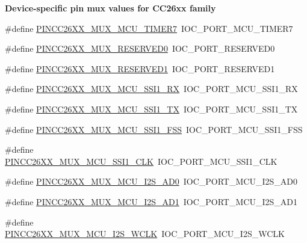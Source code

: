 \begin{Indent}{\bf Device-\/specific pin mux values for C\+C26xx family}
\begin{DoxyCompactItemize}
\item 
\#define \hyperlink{_p_i_n_c_c26_x_x_8h_a5cd4fd779c61244915aef4d6d436866b}{P\+I\+N\+C\+C26\+X\+X\+\_\+\+M\+U\+X\+\_\+\+M\+C\+U\+\_\+\+T\+I\+M\+E\+R7}~I\+O\+C\+\_\+\+P\+O\+R\+T\+\_\+\+M\+C\+U\+\_\+\+T\+I\+M\+E\+R7
\item 
\#define \hyperlink{_p_i_n_c_c26_x_x_8h_af96d092f498cb7a2550b17d9dc20c9bd}{P\+I\+N\+C\+C26\+X\+X\+\_\+\+M\+U\+X\+\_\+\+R\+E\+S\+E\+R\+V\+E\+D0}~I\+O\+C\+\_\+\+P\+O\+R\+T\+\_\+\+R\+E\+S\+E\+R\+V\+E\+D0
\item 
\#define \hyperlink{_p_i_n_c_c26_x_x_8h_ad0b60558170f22cce2aa6b5a9021fb60}{P\+I\+N\+C\+C26\+X\+X\+\_\+\+M\+U\+X\+\_\+\+R\+E\+S\+E\+R\+V\+E\+D1}~I\+O\+C\+\_\+\+P\+O\+R\+T\+\_\+\+R\+E\+S\+E\+R\+V\+E\+D1
\item 
\#define \hyperlink{_p_i_n_c_c26_x_x_8h_ac3d873c9fc963e7abdd88ac92a2efb97}{P\+I\+N\+C\+C26\+X\+X\+\_\+\+M\+U\+X\+\_\+\+M\+C\+U\+\_\+\+S\+S\+I1\+\_\+\+R\+X}~I\+O\+C\+\_\+\+P\+O\+R\+T\+\_\+\+M\+C\+U\+\_\+\+S\+S\+I1\+\_\+\+R\+X
\item 
\#define \hyperlink{_p_i_n_c_c26_x_x_8h_a6843ba0b056b1b2a7ee3b6471da4e6a1}{P\+I\+N\+C\+C26\+X\+X\+\_\+\+M\+U\+X\+\_\+\+M\+C\+U\+\_\+\+S\+S\+I1\+\_\+\+T\+X}~I\+O\+C\+\_\+\+P\+O\+R\+T\+\_\+\+M\+C\+U\+\_\+\+S\+S\+I1\+\_\+\+T\+X
\item 
\#define \hyperlink{_p_i_n_c_c26_x_x_8h_aef46bbee91ef9b7786e7ff242ebc9383}{P\+I\+N\+C\+C26\+X\+X\+\_\+\+M\+U\+X\+\_\+\+M\+C\+U\+\_\+\+S\+S\+I1\+\_\+\+F\+S\+S}~I\+O\+C\+\_\+\+P\+O\+R\+T\+\_\+\+M\+C\+U\+\_\+\+S\+S\+I1\+\_\+\+F\+S\+S
\item 
\#define \hyperlink{_p_i_n_c_c26_x_x_8h_a9625d595a8b69fa6e5405741818e1bda}{P\+I\+N\+C\+C26\+X\+X\+\_\+\+M\+U\+X\+\_\+\+M\+C\+U\+\_\+\+S\+S\+I1\+\_\+\+C\+L\+K}~I\+O\+C\+\_\+\+P\+O\+R\+T\+\_\+\+M\+C\+U\+\_\+\+S\+S\+I1\+\_\+\+C\+L\+K
\item 
\#define \hyperlink{_p_i_n_c_c26_x_x_8h_ab4fda137377a46f157d7d1ec55339dc7}{P\+I\+N\+C\+C26\+X\+X\+\_\+\+M\+U\+X\+\_\+\+M\+C\+U\+\_\+\+I2\+S\+\_\+\+A\+D0}~I\+O\+C\+\_\+\+P\+O\+R\+T\+\_\+\+M\+C\+U\+\_\+\+I2\+S\+\_\+\+A\+D0
\item 
\#define \hyperlink{_p_i_n_c_c26_x_x_8h_a3d04198ab5bfdd7a50d113833bf64bc9}{P\+I\+N\+C\+C26\+X\+X\+\_\+\+M\+U\+X\+\_\+\+M\+C\+U\+\_\+\+I2\+S\+\_\+\+A\+D1}~I\+O\+C\+\_\+\+P\+O\+R\+T\+\_\+\+M\+C\+U\+\_\+\+I2\+S\+\_\+\+A\+D1
\item 
\#define \hyperlink{_p_i_n_c_c26_x_x_8h_ab79ff812095158eced35716d506be08e}{P\+I\+N\+C\+C26\+X\+X\+\_\+\+M\+U\+X\+\_\+\+M\+C\+U\+\_\+\+I2\+S\+\_\+\+W\+C\+L\+K}~I\+O\+C\+\_\+\+P\+O\+R\+T\+\_\+\+M\+C\+U\+\_\+\+I2\+S\+\_\+\+W\+C\+L\+K

\end{DoxyCompactItemize}
\end{Indent}
